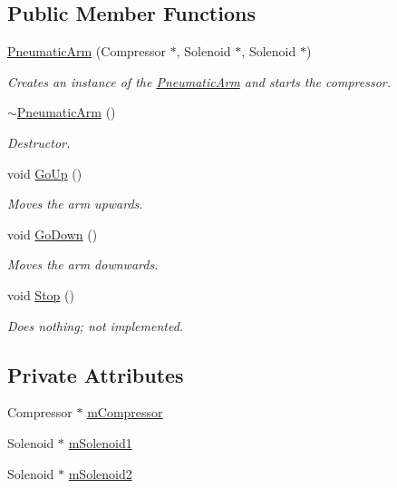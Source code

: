 \subsection*{\-Public \-Member \-Functions}
\begin{DoxyCompactItemize}
\item 
\hyperlink{class_pneumatic_arm_ab9ef438d2778ee143b853cef468f6acd}{\-Pneumatic\-Arm} (\-Compressor $\ast$, \-Solenoid $\ast$, \-Solenoid $\ast$)
\begin{DoxyCompactList}\small\item\em \-Creates an instance of the \hyperlink{class_pneumatic_arm}{\-Pneumatic\-Arm} and starts the compressor. \end{DoxyCompactList}\item 
\hyperlink{class_pneumatic_arm_adade8e69ecef8c21b048bf31d79616c2}{$\sim$\-Pneumatic\-Arm} ()
\begin{DoxyCompactList}\small\item\em \-Destructor. \end{DoxyCompactList}\item 
void \hyperlink{class_pneumatic_arm_a5bcd234f9ed510a5972f519c242a7d5c}{\-Go\-Up} ()
\begin{DoxyCompactList}\small\item\em \-Moves the arm upwards. \end{DoxyCompactList}\item 
void \hyperlink{class_pneumatic_arm_a7b20565ce0e2993d9abc9e6baacd505b}{\-Go\-Down} ()
\begin{DoxyCompactList}\small\item\em \-Moves the arm downwards. \end{DoxyCompactList}\item 
void \hyperlink{class_pneumatic_arm_a645088c55cf68b5078d2846b85bf691c}{\-Stop} ()
\begin{DoxyCompactList}\small\item\em \-Does nothing; not implemented. \end{DoxyCompactList}\end{DoxyCompactItemize}
\subsection*{\-Private \-Attributes}
\begin{DoxyCompactItemize}
\item 
\-Compressor $\ast$ \hyperlink{class_pneumatic_arm_a4bc4e3cc68efbd806c65c0639534216c}{m\-Compressor}
\item 
\-Solenoid $\ast$ \hyperlink{class_pneumatic_arm_a5872efbd0f3b4d14f1942385e92924fe}{m\-Solenoid1}
\item 
\-Solenoid $\ast$ \hyperlink{class_pneumatic_arm_ad091886b85bd01de3df51f8d6c85924d}{m\-Solenoid2}
\end{DoxyCompactItemize}


